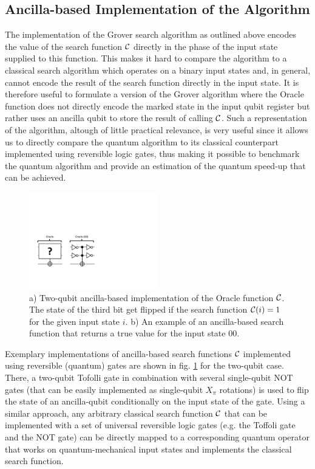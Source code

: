 \subsection{Ancilla-based Implementation of the Algorithm}

The implementation of the Grover search algorithm as outlined above encodes the value of the search function $\Or$ directly in the phase of the input state supplied to this function. This makes it hard to compare the algorithm to a classical search algorithm which operates on a binary input states and, in general, cannot encode the result of the search function directly in the input state. It is therefore useful to formulate a version of the Grover algorithm where the Oracle function does not directly encode the marked state in the input qubit register but rather uses an ancilla qubit to store the result of calling $\Or$. Such a representation of the algorithm, altough of little practical relevance, is very useful since it allows us to directly compare the quantum algorithm to its classical counterpart implemented using reversible logic gates, thus making it possible to benchmark the quantum algorithm and provide an estimation of the quantum speed-up that can be achieved.

\begin{figure}
	\centering
		\includegraphics[width=0.5\textwidth]{./material/papers/grover/different_oracle_implementations}
	\caption[]{a) Two-qubit ancilla-based implementation of the Oracle function $\Or$. The state of the third bit get flipped if the search function $\Or(i)=1$ for the given input state $i$. b) An example of an ancilla-based search function that returns a true value for the input state $00$.}
	\label{fig:GroverOracleImplementations}
\end{figure}

Exemplary implementations of ancilla-based search functions $\Or$ implemented using reversible (quantum) gates are shown in fig. \ref{fig:GroverOracleImplementations} for the two-qubit case. There, a two-qubit Tofolli gate in combination with several single-qubit NOT gates (that can be easily implemented as single-qubit $X_{\pi}$ rotations) is used to flip the state of an ancilla-qubit conditionally on the input state of the gate. Using a similar approach, any arbitrary classical search function $\Or$ that can be implemented with a set of universal reversible logic gates (e.g. the Toffoli gate and the NOT gate) can be directly mapped to a corresponding quantum operator that works on quantum-mechanical input states and implements the classical search function.

